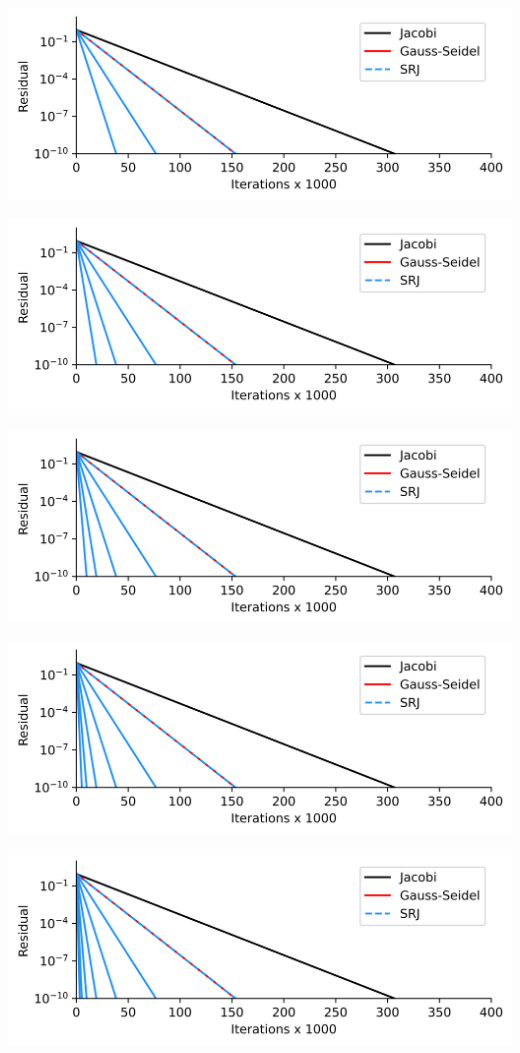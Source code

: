 \documentclass[aspectratio=169]{beamer}
\begin{document}
{\begin{frame}
\begin{overprint}
      \includegraphics[width=\textwidth]{comparaisons_1D_srj_k=8}

      \includegraphics[width=\textwidth]{comparaisons_1D_srj_k=16}

      \includegraphics[width=\textwidth]{comparaisons_1D_srj_k=32}

      \includegraphics[width=\textwidth]{comparaisons_1D_srj_k=64}

      \includegraphics[width=\textwidth]{comparaisons_1D_srj_k=128}


\end{overprint}
\end{frame}}
\end{document}
